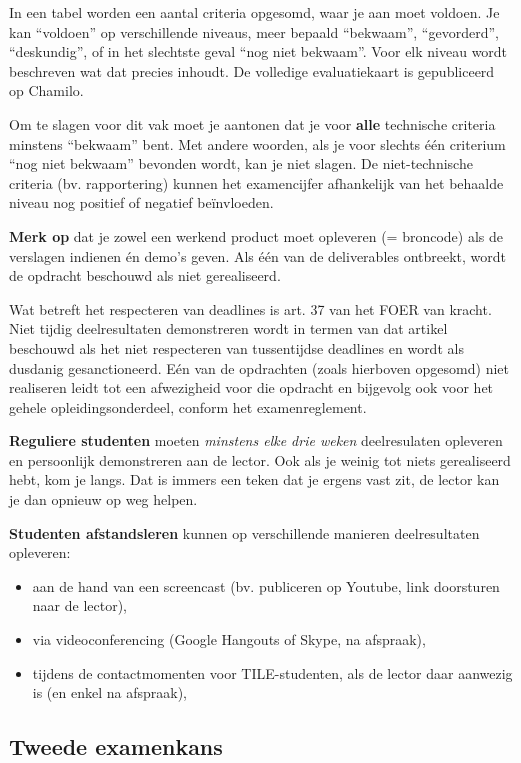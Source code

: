 In een tabel worden een aantal criteria opgesomd, waar je aan moet voldoen. Je kan ``voldoen'' op verschillende niveaus, meer bepaald ``bekwaam'', ``gevorderd'', ``deskundig'', of in het slechtste geval ``nog niet bekwaam''. Voor elk niveau wordt beschreven wat dat precies inhoudt. De volledige evaluatiekaart is gepubliceerd op Chamilo.

Om te slagen voor dit vak moet je aantonen dat je voor \textbf{alle} technische criteria minstens ``bekwaam'' bent. Met andere woorden, als je voor slechts één criterium ``nog niet bekwaam'' bevonden wordt, kan je niet slagen. De niet-technische criteria (bv. rapportering) kunnen het examencijfer afhankelijk van het behaalde niveau nog positief of negatief beïnvloeden.


\textbf{Merk op} dat je zowel een werkend product moet opleveren (= broncode) als de verslagen indienen én demo's geven. Als één van de deliverables ontbreekt, wordt de opdracht beschouwd als niet gerealiseerd.

Wat betreft het respecteren van deadlines is art. 37 van het FOER van kracht. Niet tijdig deelresultaten demonstreren wordt in termen van dat artikel beschouwd als het niet respecteren van tussentijdse deadlines en wordt als dusdanig gesanctioneerd. Eén van de opdrachten (zoals hierboven opgesomd) niet realiseren leidt tot een afwezigheid voor die opdracht en bijgevolg ook voor het gehele opleidingsonderdeel, conform het examenreglement.

\textbf{Reguliere studenten} moeten \emph{minstens elke drie weken} deelresulaten opleveren en persoonlijk demonstreren aan de lector. Ook als je weinig tot niets gerealiseerd hebt, kom je langs. Dat is immers een teken dat je ergens vast zit, de lector kan je dan opnieuw op weg helpen.

\textbf{Studenten afstandsleren} kunnen op verschillende manieren deelresultaten opleveren:

\begin{itemize}
  \item aan de hand van een screencast (bv. publiceren op Youtube, link doorsturen naar de lector),
  \item via videoconferencing (Google Hangouts of Skype, na afspraak),
  \item tijdens de contactmomenten voor TILE-studenten, als de lector daar aanwezig is (en enkel na afspraak),
\end{itemize}

\subsection{Tweede examenkans}
\label{subs:tweede-examenkans}

